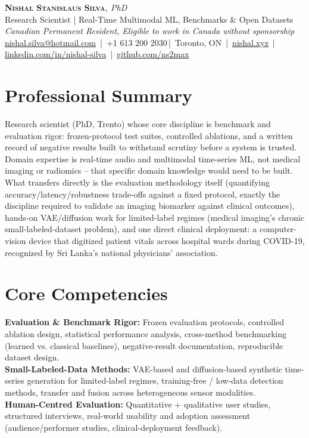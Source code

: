 \documentclass[11pt]{article}
\makeatletter
\newcommand{\cvName}{Nishal Stanislaus Silva}
\newcommand{\cvEmail}{nishal.silva@hotmail.com}
\newcommand{\cvPhone}{+1 613 200 2030}
\newcommand{\cvCity}{Toronto, ON}
\newcommand{\cvSite}{https://nishal.xyz}
\newcommand{\cvLinkedIn}{https://www.linkedin.com/in/nishal-silva}
\newcommand{\cvGitHub}{https://github.com/ns2max}
\newcommand{\cvStatus}{Canadian Permanent Resident, Eligible to work in Canada without sponsorship}
\newcommand{\cvTagline}{Research Scientist | Real-Time Multimodal ML, Benchmarks \& Open Datasets}
\makeatother
\begin{document}
\pagestyle{empty}
\begin{center}
    {\LARGE \scshape \textbf{\cvName}}{\large \textit{, PhD}}\\[1pt]
    {\small \cvTagline}\\[1pt]
    {\footnotesize\textit{\cvStatus}}\\[1pt]
    {\small
    \href{mailto:\cvEmail}{\cvEmail} \,|\, \cvPhone \,|\, \cvCity
    \,|\, \href{\cvSite}{nishal.xyz} \,|\, \href{\cvLinkedIn}{linkedin.com/in/nishal-silva}
    \,|\, \href{\cvGitHub}{github.com/ns2max}}
\end{center}

\section*{Professional Summary}
Research scientist (PhD, Trento) whose core discipline is benchmark and evaluation rigor: frozen-protocol test suites, controlled ablations, and a written record of negative results built to withstand scrutiny before a system is trusted. Domain expertise is real-time audio and multimodal time-series ML, not medical imaging or radiomics -- that specific domain knowledge would need to be built. What transfers directly is the evaluation methodology itself (quantifying accuracy/latency/robustness trade-offs against a fixed protocol, exactly the discipline required to validate an imaging biomarker against clinical outcomes), hands-on VAE/diffusion work for limited-label regimes (medical imaging's chronic small-labeled-dataset problem), and one direct clinical deployment: a computer-vision device that digitized patient vitals across hospital wards during COVID-19, recognized by Sri Lanka's national physicians' association.

\section*{Core Competencies}
\textbf{Evaluation \& Benchmark Rigor:} Frozen evaluation protocols, controlled ablation design, statistical performance analysis, cross-method benchmarking (learned vs. classical baselines), negative-result documentation, reproducible dataset design. \\
\textbf{Small-Labeled-Data Methods:} VAE-based and diffusion-based synthetic time-series generation for limited-label regimes, training-free / low-data detection methods, transfer and fusion across heterogeneous sensor modalities. \\
\textbf{Human-Centred Evaluation:} Quantitative + qualitative user studies, structured interviews, real-world usability and adoption assessment (audience/performer studies, clinical-deployment feedback).
\end{document}
